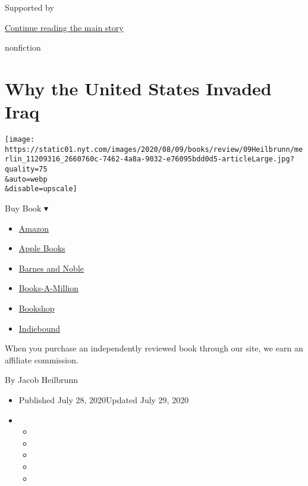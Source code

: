 Supported by

\protect\hyperlink{after-sponsor}{Continue reading the main story}

nonfiction

\hypertarget{why-the-united-states-invaded-iraq}{%
\section{Why the United States Invaded
Iraq}\label{why-the-united-states-invaded-iraq}}

\texttt{[image: https://static01.nyt.com/images/2020/08/09/books/review/09Heilbrunn/merlin\_11209316\_2660760c-7462-4a8a-9032-e76095bdd0d5-articleLarge.jpg?quality=75\\\&auto=webp\\\&disable=upscale]}

Buy Book ▾

\begin{itemize}
\tightlist
\item
  \href{https://www.amazon.com/gp/search?index=books\&tag=NYTBSREV-20\&field-keywords=To+Start+a+War+Robert+Draper}{Amazon}
\item
  \href{https://du-gae-books-dot-nyt-du-prd.appspot.com/buy?title=To+Start+a+War\&author=Robert+Draper}{Apple
  Books}
\item
  \href{https://www.anrdoezrs.net/click-7990613-11819508?url=https\%3A\%2F\%2Fwww.barnesandnoble.com\%2Fw\%2F\%3Fean\%3D9780525561040}{Barnes
  and Noble}
\item
  \href{https://www.anrdoezrs.net/click-7990613-35140?url=https\%3A\%2F\%2Fwww.booksamillion.com\%2Fp\%2FTo\%2BStart\%2Ba\%2BWar\%2FRobert\%2BDraper\%2F9780525561040}{Books-A-Million}
\item
  \href{https://bookshop.org/a/3546/9780525561040}{Bookshop}
\item
  \href{https://www.indiebound.org/book/9780525561040?aff=NYT}{Indiebound}
\end{itemize}

When you purchase an independently reviewed book through our site, we
earn an affiliate commission.

By Jacob Heilbrunn

\begin{itemize}
\item
  Published July 28, 2020Updated July 29, 2020
\item
  \begin{itemize}
  \item
  \item
  \item
  \item
  \item
  \end{itemize}
\end{itemize}

